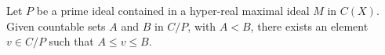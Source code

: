 Let $P$ be a prime ideal contained in a hyper-real maximal ideal $M$ in $C(X)$. Given countable sets $A$ and $B$ in $C/P$, with $A < B$, there exists an element $v \in C/P$ such that $A \leq v \leq B$.
